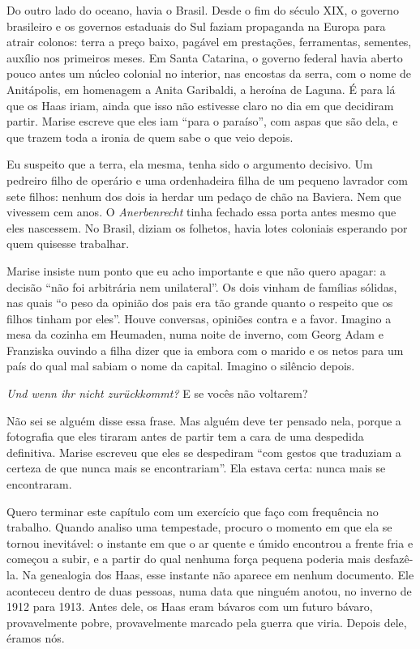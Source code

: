 \documentclass[
  brazilian,
  11pt,
  openany]{book}
\begin{document}
Do outro lado do oceano, havia o Brasil. Desde o fim do século XIX, o
governo brasileiro e os governos estaduais do Sul faziam propaganda na
Europa para atrair colonos: terra a preço baixo, pagável em prestações,
ferramentas, sementes, auxílio nos primeiros meses. Em Santa Catarina, o
governo federal havia aberto pouco antes um núcleo colonial no interior,
nas encostas da serra, com o nome de Anitápolis, em homenagem a Anita
Garibaldi, a heroína de Laguna. É para lá que os Haas iriam, ainda que
isso não estivesse claro no dia em que decidiram partir. Marise escreve
que eles iam ``para o paraíso'', com aspas que são dela, e que trazem
toda a ironia de quem sabe o que veio depois.

Eu suspeito que a terra, ela mesma, tenha sido o argumento decisivo. Um
pedreiro filho de operário e uma ordenhadeira filha de um pequeno
lavrador com sete filhos: nenhum dos dois ia herdar um pedaço de chão na
Baviera. Nem que vivessem cem anos. O \emph{Anerbenrecht} tinha fechado
essa porta antes mesmo que eles nascessem. No Brasil, diziam os
folhetos, havia lotes coloniais esperando por quem quisesse trabalhar.

Marise insiste num ponto que eu acho importante e que não quero apagar:
a decisão ``não foi arbitrária nem unilateral''. Os dois vinham de
famílias sólidas, nas quais ``o peso da opinião dos pais era tão grande
quanto o respeito que os filhos tinham por eles''. Houve conversas,
opiniões contra e a favor. Imagino a mesa da cozinha em Heumaden, numa
noite de inverno, com Georg Adam e Franziska ouvindo a filha dizer que
ia embora com o marido e os netos para um país do qual mal sabiam o nome
da capital. Imagino o silêncio depois.

\emph{Und wenn ihr nicht zurückkommt?} E se vocês não voltarem?

Não sei se alguém disse essa frase. Mas alguém deve ter pensado nela,
porque a fotografia que eles tiraram antes de partir tem a cara de uma
despedida definitiva. Marise escreveu que eles se despediram ``com
gestos que traduziam a certeza de que nunca mais se encontrariam''. Ela
estava certa: nunca mais se encontraram.

Quero terminar este capítulo com um exercício que faço com frequência no
trabalho. Quando analiso uma tempestade, procuro o momento em que ela se
tornou inevitável: o instante em que o ar quente e úmido encontrou a
frente fria e começou a subir, e a partir do qual nenhuma força pequena
poderia mais desfazê-la. Na genealogia dos Haas, esse instante não
aparece em nenhum documento. Ele aconteceu dentro de duas pessoas, numa
data que ninguém anotou, no inverno de 1912 para 1913. Antes dele, os
Haas eram bávaros com um futuro bávaro, provavelmente pobre,
provavelmente marcado pela guerra que viria. Depois dele, éramos nós.
\end{document}

